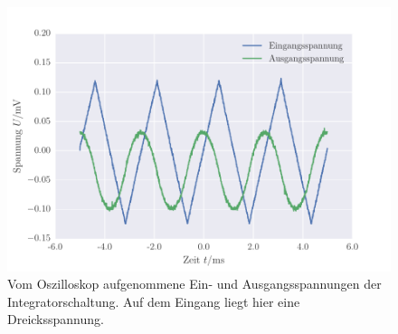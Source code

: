 \FloatBarrier
\begin{figure}[!h]
\centering
\includegraphics[scale=1]{../Grafiken/Integrator_Oszilloskop_Dreieck.pdf}
\caption{Vom Oszilloskop aufgenommene Ein- und Ausgangsspannungen der Integratorschaltung. Auf dem Eingang
	liegt hier eine Dreicksspannung.\label{fig:integrator_oszilloskop_dreieck}}
\end{figure}
\FloatBarrier
